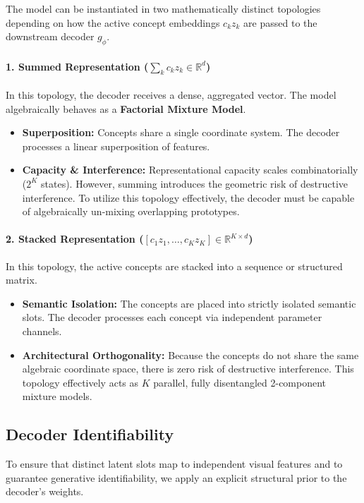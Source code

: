 \documentclass[11pt, a4paper]{article}
\begin{document}
The model can be instantiated in two mathematically distinct topologies depending on how the active concept embeddings $c_k z_k$ are passed to the downstream decoder $g_\phi$.

\paragraph{1. Summed Representation ($\sum_{k} c_k z_k \in \mathbb{R}^d$)}
In this topology, the decoder receives a dense, aggregated vector. The model algebraically behaves as a \textbf{Factorial Mixture Model}.
\begin{itemize}
    \item \textbf{Superposition:} Concepts share a single coordinate system. The decoder processes a linear superposition of features.
    \item \textbf{Capacity \& Interference:} Representational capacity scales combinatorially ($2^K$ states). However, summing introduces the geometric risk of destructive interference. To utilize this topology effectively, the decoder must be capable of algebraically un-mixing overlapping prototypes.
\end{itemize}

\paragraph{2. Stacked Representation ($[c_1 z_1, \dots, c_K z_K] \in \mathbb{R}^{K \times d}$)}
In this topology, the active concepts are stacked into a sequence or structured matrix.
\begin{itemize}
    \item \textbf{Semantic Isolation:} The concepts are placed into strictly isolated semantic slots. The decoder processes each concept via independent parameter channels.
    \item \textbf{Architectural Orthogonality:} Because the concepts do not share the same algebraic coordinate space, there is zero risk of destructive interference. This topology effectively acts as $K$ parallel, fully disentangled 2-component mixture models.
\end{itemize}

\subsection{Decoder Identifiability}

To ensure that distinct latent slots map to independent visual features and to guarantee generative identifiability, we apply an explicit structural prior to the decoder's weights.
\end{document}
